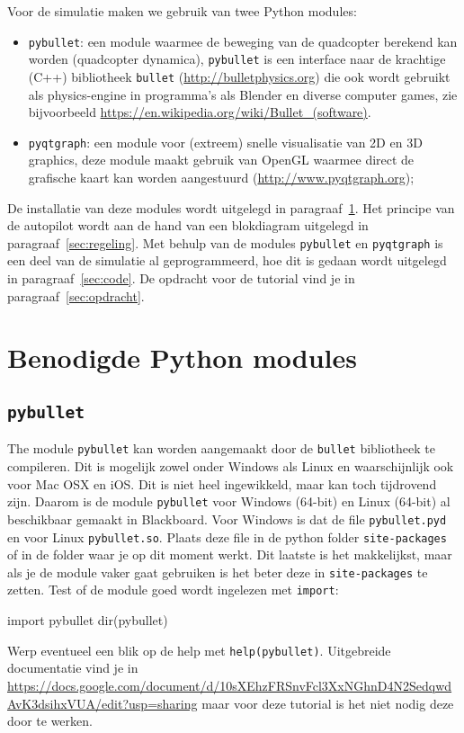 \documentclass[a4paper,11pt]{article}
\begin{document}
Voor de simulatie maken we gebruik van twee Python modules:
\begin{itemize}
  \item \texttt{pybullet}: een module waarmee de beweging van de quadcopter
    berekend kan worden (quadcopter dynamica), \texttt{pybullet} is een
    interface naar de krachtige (C++) bibliotheek \texttt{bullet}
    (\url{http://bulletphysics.org}) die ook wordt gebruikt als physics-engine
    in programma's als Blender en diverse computer games, zie bijvoorbeeld
    \url{https://en.wikipedia.org/wiki/Bullet_(software)}. 
  \item \texttt{pyqtgraph}: een module voor (extreem) snelle visualisatie van 2D
    en 3D graphics, deze module maakt gebruik van OpenGL waarmee direct de
    grafische kaart kan worden aangestuurd (\url{http://www.pyqtgraph.org});
\end{itemize}
De installatie van deze modules wordt uitgelegd in
paragraaf~\ref{sec:install}. Het principe van de autopilot wordt aan de hand
van een blokdiagram uitgelegd in paragraaf~\ref{sec:regeling}. 
Met behulp van de modules \texttt{pybullet} en \texttt{pyqtgraph} is een deel van de simulatie al
geprogrammeerd, hoe dit is gedaan wordt uitgelegd in paragraaf~\ref{sec:code}.
De opdracht voor de tutorial vind je in paragraaf~\ref{sec:opdracht}.

\section{Benodigde Python modules}
\label{sec:install}
\subsection{\texttt{pybullet}}
The module \texttt{pybullet} kan worden aangemaakt door de \texttt{bullet}
bibliotheek te compileren. Dit is mogelijk zowel onder Windows als Linux en
waarschijnlijk ook voor Mac OSX en iOS. Dit is niet heel ingewikkeld, maar kan
toch tijdrovend zijn. Daarom is de module \texttt{pybullet} voor Windows
(64-bit) en Linux (64-bit) al beschikbaar gemaakt in Blackboard. Voor Windows
is dat de file \texttt{pybullet.pyd} en voor Linux \texttt{pybullet.so}. Plaats
deze file in de python folder \texttt{site-packages} of in de folder waar je op
dit moment werkt. Dit laatste is het makkelijkst, maar als je de module vaker gaat
gebruiken is het beter deze in \texttt{site-packages} te zetten. Test of de module goed wordt ingelezen met \texttt{import}:
\begin{pyconsole}
import pybullet
dir(pybullet)

\end{pyconsole}
Werp eventueel een blik op de help met \texttt{help(pybullet)}. Uitgebreide
documentatie vind je in 
\url{https://docs.google.com/document/d/10sXEhzFRSnvFcl3XxNGhnD4N2SedqwdAvK3dsihxVUA/edit?usp=sharing}
maar voor deze tutorial is het niet nodig deze door te werken.
\end{document}
